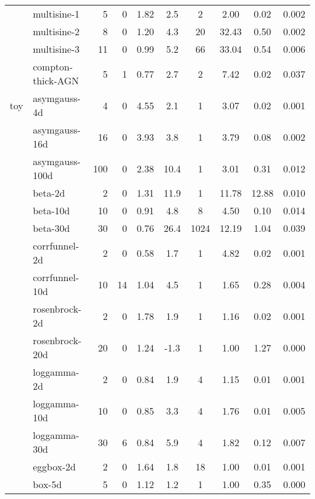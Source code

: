 \begin{tabular}{ll|rrcccccc}
                     & multisine-1          & 5   & 0    & 1.82 & 2.5 &    2 & 2.00 & 0.02 & 0.002 \\
                     & multisine-2          & 8   & 0    & 1.20 & 4.3 &   20 & 32.43 & 0.50 & 0.002 \\
                     & multisine-3          & 11  & 0    & 0.99 & 5.2 &   66 & 33.04 & 0.54 & 0.006 \\
                     & compton-thick-AGN    & 5   & 1    & 0.77 & 2.7 &    2 & 7.42 & 0.02 & 0.037 \\
\hline
toy                  & asymgauss-4d         & 4   & 0    & 4.55 & 2.1 &    1 & 3.07 & 0.02 & 0.001 \\
                     & asymgauss-16d        & 16  & 0    & 3.93 & 3.8 &    1 & 3.79 & 0.08 & 0.002 \\
                     & asymgauss-100d       & 100 & 0    & 2.38 & 10.4 &    1 & 3.01 & 0.31 & 0.012 \\
                     & beta-2d              & 2   & 0    & 1.31 & 11.9 &    1 & 11.78 & 12.88 & 0.010 \\
                     & beta-10d             & 10  & 0    & 0.91 & 4.8 &    8 & 4.50 & 0.10 & 0.014 \\
                     & beta-30d             & 30  & 0    & 0.76 & 26.4 & 1024 & 12.19 & 1.04 & 0.039 \\
                     & corrfunnel-2d        & 2   & 0    & 0.58 & 1.7 &    1 & 4.82 & 0.02 & 0.001 \\
                     & corrfunnel-10d       & 10  & 14   & 1.04 & 4.5 &    1 & 1.65 & 0.28 & 0.004 \\
                     & rosenbrock-2d        & 2   & 0    & 1.78 & 1.9 &    1 & 1.16 & 0.02 & 0.001 \\
                     & rosenbrock-20d       & 20  & 0    & 1.24 & -1.3 &    1 & 1.00 & 1.27 & 0.000 \\
                     & loggamma-2d          & 2   & 0    & 0.84 & 1.9 &    4 & 1.15 & 0.01 & 0.001 \\
                     & loggamma-10d         & 10  & 0    & 0.85 & 3.3 &    4 & 1.76 & 0.01 & 0.005 \\
                     & loggamma-30d         & 30  & 6    & 0.84 & 5.9 &    4 & 1.82 & 0.12 & 0.007 \\
                     & eggbox-2d            & 2   & 0    & 1.64 & 1.8 &   18 & 1.00 & 0.01 & 0.001 \\
                     & box-5d               & 5   & 0    & 1.12 & 1.2 &    1 & 1.00 & 0.35 & 0.000 \\

\end{tabular}
